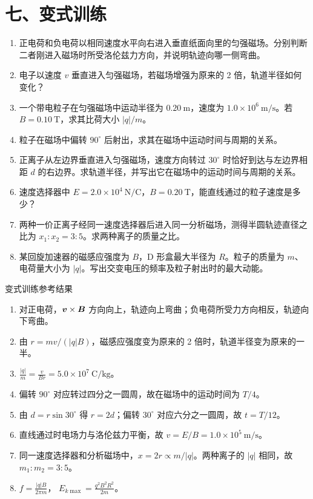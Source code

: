 \section*{七、变式训练}

\begin{enumerate}
  \item 正电荷和负电荷以相同速度水平向右进入垂直纸面向里的匀强磁场。分别判断二者刚进入磁场时所受洛伦兹力方向，并说明轨迹向哪一侧弯曲。
  \item 电子以速度 $v$ 垂直进入匀强磁场，若磁场增强为原来的 2 倍，轨道半径如何变化？
  \begin{center}
  
  \end{center}
  \item 一个带电粒子在匀强磁场中运动半径为 $0.20\ \mathrm{m}$，速度为 $1.0\times10^6\ \mathrm{m/s}$。若 $B=0.10\ \mathrm{T}$，求其比荷大小 $|q|/m$。
  \item 粒子在磁场中偏转 $90^\circ$ 后射出，求其在磁场中运动时间与周期的关系。
  \begin{center}
  
  \end{center}
  \item 正离子从左边界垂直进入匀强磁场，速度方向转过 $30^\circ$ 时恰好到达与左边界相距 $d$ 的右边界。求轨道半径，并写出它在磁场中的运动时间与周期的关系。
  \item 速度选择器中 $E=2.0\times10^4\ \mathrm{N/C}$，$B=0.20\ \mathrm{T}$，能直线通过的粒子速度是多少？
  \item 两种一价正离子经同一速度选择器后进入同一分析磁场，测得半圆轨迹直径之比为 $x_1:x_2=3:5$。求两种离子的质量之比。
  \item 某回旋加速器的磁感应强度为 $B$，D 形盒最大半径为 $R$。粒子的质量为 $m$、电荷量大小为 $|q|$。写出交变电压的频率及粒子射出时的最大动能。
\end{enumerate}

\begin{learningbox}{变式训练参考结果}
\begin{enumerate}[itemsep=0.45em,topsep=0.3em,parsep=0pt]
  \item 对正电荷，$\boldsymbol{v}\times\boldsymbol{B}$ 方向向上，轨迹向上弯曲；负电荷所受力方向相反，轨迹向下弯曲。
  \item 由 $r=mv/(|q|B)$，磁感应强度变为原来的 2 倍时，轨道半径变为原来的一半。
  \item $\displaystyle \frac{|q|}{m}=\frac{v}{Br}
  =5.0\times10^7\ \mathrm{C/kg}$。
  \item 偏转 $90^\circ$ 对应转过四分之一圆周，故在磁场中的运动时间为 $T/4$。
  \item 由 $d=r\sin30^\circ$ 得 $r=2d$；偏转 $30^\circ$ 对应六分之一圆周，故 $t=T/12$。
  \item 直线通过时电场力与洛伦兹力平衡，故
  $v=E/B=1.0\times10^5\ \mathrm{m/s}$。
  \item 同一速度选择器和分析磁场中，$x=2r\propto m/|q|$。两种离子的 $|q|$ 相同，故 $m_1:m_2=3:5$。
  \item $\displaystyle f=\frac{|q|B}{2\pi m}$，
  $\displaystyle E_{k\max}=\frac{q^2B^2R^2}{2m}$。
\end{enumerate}
\end{learningbox}

